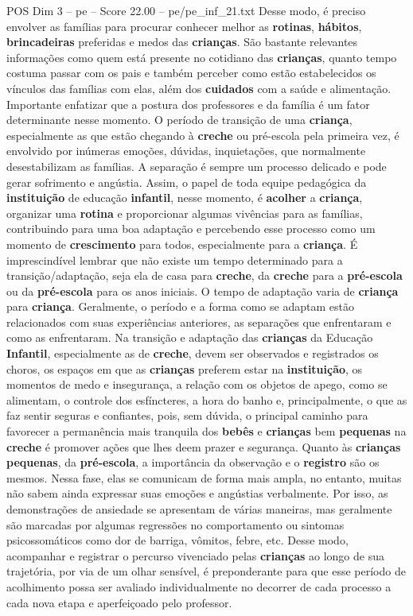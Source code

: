 \begin{textsample}{POS Dim 3 – pe – Score 22.00 – pe/pe\_inf\_21.txt}
Desse modo, é preciso envolver as famílias para procurar conhecer melhor as \textbf{rotinas}, \textbf{hábitos}, \textbf{brincadeiras} preferidas e medos das \textbf{crianças}.
São bastante relevantes informações como quem está presente no cotidiano das \textbf{crianças}, quanto tempo costuma passar com os pais e também perceber como estão estabelecidos os vínculos das famílias com elas, além dos \textbf{cuidados} com a saúde e alimentação.
Importante enfatizar que a postura dos professores e da família é um fator determinante nesse momento.
O período de transição de uma \textbf{criança}, especialmente as que estão chegando à \textbf{creche} ou pré-escola pela primeira vez, é envolvido por inúmeras emoções, dúvidas, inquietações, que normalmente desestabilizam as famílias.
A separação é sempre um processo delicado e pode gerar sofrimento e angústia.
Assim, o papel de toda equipe pedagógica da \textbf{instituição} de educação \textbf{infantil}, nesse momento, é \textbf{acolher} a \textbf{criança}, organizar uma \textbf{rotina} e proporcionar algumas vivências para as famílias, contribuindo para uma boa adaptação e percebendo esse processo como um momento de \textbf{crescimento} para todos, especialmente para a \textbf{criança}.
É imprescindível lembrar que não existe um tempo determinado para a transição/adaptação, seja ela de casa para \textbf{creche}, da \textbf{creche} para a \textbf{pré-escola} ou da \textbf{pré-escola} para os anos iniciais.
O tempo de adaptação varia de \textbf{criança} para \textbf{criança}.
Geralmente, o período e a forma como se adaptam estão relacionados com suas experiências anteriores, as separações que enfrentaram e como as enfrentaram.
Na transição e adaptação das \textbf{crianças} da Educação \textbf{Infantil}, especialmente as de \textbf{creche}, devem ser observados e registrados os choros, os espaços em que as \textbf{crianças} preferem estar na \textbf{instituição}, os momentos de medo e insegurança, a relação com os objetos de apego, como se alimentam, o controle dos esfíncteres, a hora do banho e, principalmente, o que as faz sentir seguras e confiantes, pois, sem dúvida, o principal caminho para favorecer a permanência mais tranquila dos \textbf{bebês} e \textbf{crianças} bem \textbf{pequenas} na \textbf{creche} é promover ações que lhes deem prazer e segurança.
Quanto às \textbf{crianças} \textbf{pequenas}, da \textbf{pré-escola}, a importância da observação e o \textbf{registro} são os mesmos.
Nessa fase, elas se comunicam de forma mais ampla, no entanto, muitas não sabem ainda expressar suas emoções e angústias verbalmente.
Por isso, as demonstrações de ansiedade se apresentam de várias maneiras, mas geralmente são marcadas por algumas regressões no comportamento ou sintomas psicossomáticos como dor de barriga, vômitos, febre, etc.
Desse modo, acompanhar e registrar o percurso vivenciado pelas \textbf{crianças} ao longo de sua trajetória, por via de um olhar sensível, é preponderante para que esse período de acolhimento possa ser avaliado individualmente no decorrer de cada processo a cada nova etapa e aperfeiçoado pelo professor.


\end{textsample}
